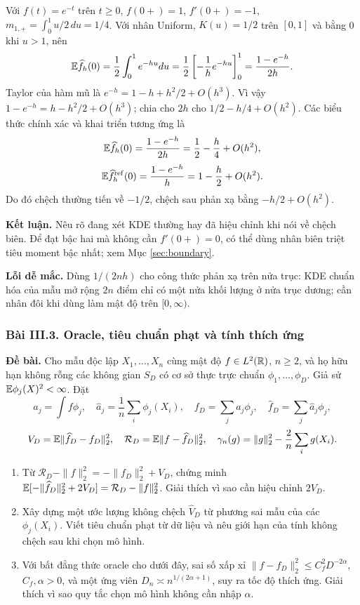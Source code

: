 Với $f(t)=e^{-t}$ trên $t\geq0$, $f(0+)=1$, $f'(0+)=-1$,
$m_{1,+}=\int_0^1u/2\,du=1/4$.
Với nhân Uniform, $K(u)=1/2$ trên $[0,1]$ và bằng 0 khi $u>1$,
nên
\[
\mathbb E\widehat f_h(0)=\frac12\int_0^1e^{-hu}du
=\frac12\left[-\frac1h e^{-hu}\right]_0^1
=\frac{1-e^{-h}}{2h}.
\]
Taylor của hàm mũ là $e^{-h}=1-h+h^2/2+O(h^3)$.
Vì vậy $1-e^{-h}=h-h^2/2+O(h^3)$;
chia cho $2h$ cho $1/2-h/4+O(h^2)$.
Các biểu thức chính xác và khai triển tương ứng là
\[
\mathbb E\widehat f_h(0)=\frac{1-e^{-h}}{2h}=\frac12-\frac h4+O(h^2),
\]
\[
\mathbb E\widehat f_h^{\mathrm{ref}}(0)=\frac{1-e^{-h}}h=1-\frac h2+O(h^2).
\]
Do đó chệch thường tiến về $-1/2$, chệch sau phản xạ bằng $-h/2+O(h^2)$.

\textbf{Kết luận.} Nêu rõ đang xét KDE thường hay đã hiệu chỉnh khi nói về chệch biên.
Để đạt bậc hai mà không cần $f'(0+)=0$, có thể dùng nhân biên triệt tiêu moment bậc nhất;
xem Mục \ref{sec:boundary}.

\textbf{Lỗi dễ mắc.} Dùng $1/(2nh)$ cho công thức phản xạ trên nửa trục:
KDE chuẩn hóa của mẫu mở rộng $2n$ điểm chỉ có một nửa khối lượng ở nửa trục dương;
cần nhân đôi khi dùng làm mật độ trên $[0,\infty)$.

\subsubsection*{Bài III.3. Oracle, tiêu chuẩn phạt và tính thích ứng}\label{ot45:oracle}
\textbf{Đề bài.} Cho mẫu độc lập $X_1,\ldots,X_n$ cùng mật độ $f\in L^2(\mathbb R)$, $n\geq2$,
và họ hữu hạn không rỗng các không gian $S_D$ có cơ sở thực trực chuẩn
$\phi_1,\ldots,\phi_D$. Giả sử $\mathbb E\phi_j(X)^2<\infty$. Đặt
\[
a_j=\int f\phi_j,\quad \widehat a_j=\frac1n\sum_i\phi_j(X_i),\quad
f_D=\sum_ja_j\phi_j,\quad \widehat f_D=\sum_j\widehat a_j\phi_j,
\]
\[
V_D=\mathbb E\|\widehat f_D-f_D\|_2^2,\quad
\mathcal R_D=\mathbb E\|f-\widehat f_D\|_2^2,\quad
\gamma_n(g)=\|g\|_2^2-\frac2n\sum_i g(X_i).
\]
\begin{enumerate}[label=(\alph*)]
\item Từ $\mathcal R_D-\|f\|_2^2=-\|f_D\|_2^2+V_D$,
chứng minh $\mathbb E[-\|\widehat f_D\|_2^2+2V_D]=\mathcal R_D-\|f\|_2^2$.
Giải thích vì sao cần hiệu chỉnh $2V_D$.
\item Xây dựng một ước lượng không chệch $\widehat V_D$ từ phương sai mẫu của các
$\phi_j(X_i)$. Viết tiêu chuẩn phạt từ dữ liệu và nêu giới hạn của tính không chệch sau khi chọn mô hình.
\item Với bất đẳng thức oracle cho dưới đây, sai số xấp xỉ
$\|f-f_D\|_2^2\leq C_f^2D^{-2\alpha}$, $C_f,\alpha>0$, và một ứng viên
$D_n\asymp n^{1/(2\alpha+1)}$, suy ra tốc độ thích ứng.
Giải thích vì sao quy tắc chọn mô hình không cần nhập $\alpha$.
\end{enumerate}

